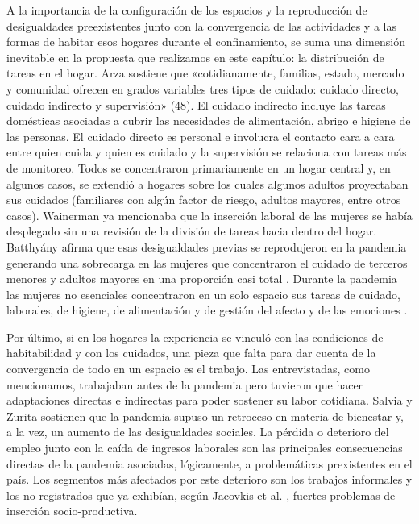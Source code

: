 \begin{refsection}
A la importancia de la configuración de los espacios y la reproducción de desigualdades preexistentes junto con la convergencia de las actividades y a las formas de habitar esos hogares durante el confinamiento, se suma una dimensión inevitable en la propuesta que realizamos en este capítulo: la distribución de tareas en el hogar. Arza \protect\parencite*{4223-ARZA2020} sostiene que «cotidianamente, familias, estado, mercado y comunidad ofrecen en grados variables tres tipos de cuidado: cuidado directo, cuidado indirecto y supervisión» (48). El cuidado indirecto incluye las tareas domésticas asociadas a cubrir las necesidades de alimentación, abrigo e higiene de las personas. El cuidado directo es personal e involucra el contacto cara a cara entre quien cuida y quien es cuidado y la supervisión se relaciona con tareas más de monitoreo. Todos se concentraron primariamente en un hogar central y, en algunos casos, se extendió a hogares sobre los cuales algunos adultos proyectaban sus cuidados (familiares con algún factor de riesgo, adultos mayores, entre otros casos). Wainerman \protect\parencite*{4221-WAINERMAN2003} ya mencionaba que la inserción laboral de las mujeres se había desplegado sin una revisión de la división de tareas hacia dentro del hogar. Batthyány \protect\parencite{4263-BATTHYANY2020} afirma que esas desigualdades previas se reprodujeron en la pandemia generando una sobrecarga en las mujeres que concentraron el cuidado de terceros menores y adultos mayores en una proporción casi total \protect\parencite{4257-MENESESMEDINA2023,4258-PEREYRA2023}. Durante la pandemia las mujeres no esenciales concentraron en un solo espacio sus tareas de cuidado, laborales, de higiene, de alimentación y de gestión del afecto y de las emociones \protect\parencite{4210-MOGUILLANSKY2024}.

Por último, si en los hogares la experiencia se vinculó con las condiciones de habitabilidad y con los cuidados, una pieza que falta para dar cuenta de la convergencia de todo en un espacio es el trabajo. Las entrevistadas, como mencionamos, trabajaban antes de la pandemia pero tuvieron que hacer adaptaciones directas e indirectas para poder sostener su labor cotidiana. Salvia y Zurita \protect\parencite*{4259-SALVIA2021} sostienen que la pandemia supuso un retroceso en materia de bienestar y, a la vez, un aumento de las desigualdades sociales. La pérdida o deterioro del empleo junto con la caída de ingresos laborales son las principales consecuencias directas de la pandemia asociadas, lógicamente, a problemáticas prexistentes en el país. Los segmentos más afectados por este deterioro son los trabajos informales y los no registrados que ya exhibían, según Jacovkis et al. \protect\parencite*{4260-JACOVKIS2021}, fuertes problemas de inserción socio-productiva.


\end{refsection}
